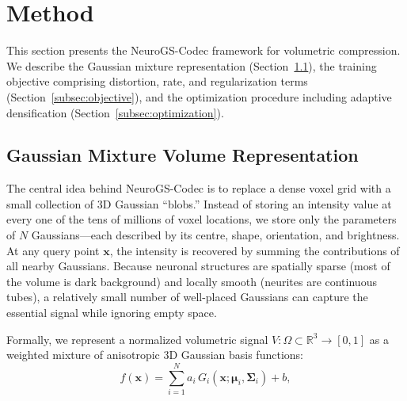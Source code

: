 \documentclass[11pt,a4paper]{article}
\begin{document}

\section{Method}
\label{sec:method}

This section presents the NeuroGS-Codec framework for volumetric compression. We describe the Gaussian mixture representation (Section~\ref{subsec:representation}), the training objective comprising distortion, rate, and regularization terms (Section~\ref{subsec:objective}), and the optimization procedure including adaptive densification (Section~\ref{subsec:optimization}).

\subsection{Gaussian Mixture Volume Representation}
\label{subsec:representation}

The central idea behind NeuroGS-Codec is to replace a dense voxel grid with a small collection of 3D Gaussian ``blobs.''  Instead of storing an intensity value at every one of the tens of millions of voxel locations, we store only the parameters of $N$ Gaussians---each described by its centre, shape, orientation, and brightness.  At any query point $\mathbf{x}$, the intensity is recovered by summing the contributions of all nearby Gaussians.  Because neuronal structures are spatially sparse (most of the volume is dark background) and locally smooth (neurites are continuous tubes), a relatively small number of well-placed Gaussians can capture the essential signal while ignoring empty space.

Formally, we represent a normalized volumetric signal $V:\Omega\subset\mathbb{R}^3\rightarrow [0,1]$ as a weighted mixture of anisotropic 3D Gaussian basis functions:
\begin{equation}
f(\mathbf{x}) = \sum_{i=1}^{N} a_i\,G_i(\mathbf{x};\boldsymbol{\mu}_i,\boldsymbol{\Sigma}_i) + b,
\label{eq:implicit_function}
\end{equation}
\end{document}
